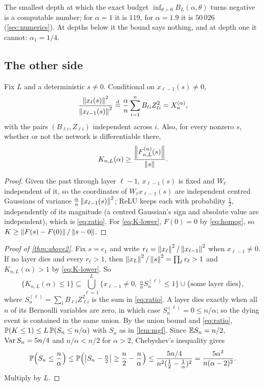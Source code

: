 The smallest depth at which the exact budget $\inf_{\theta>0}B_L(\alpha,\theta)$ turns negative is a computable number; for $\alpha=1$ it is $119$, for $\alpha=1.9$ it is $50\,026$ (\cref{sec:numerics}). At depths below it the bound says nothing, and at depth one it cannot: $\alpha_1=1/4$.

\subsection{The other side}

\begin{lemma}\label{lem:forward}
Fix $L$ and a deterministic $s\ne0$. Conditional on $x_{\ell-1}(s)\ne0$,
\begin{equation}\label{eq:ratio}
\frac{\left\lVert x_\ell(s)\right\rVert^2}{\left\lVert x_{\ell-1}(s)\right\rVert^2}\overset{\mathrm{d}}{=}\frac\alpha n\sum_{i=1}^nB_{\ell i}Z_{\ell i}^2=X_n^{(\alpha)},
\end{equation}
with the pairs $(B_{\ell i},Z_{\ell i})$ independent across $i$. Also, for every nonzero $s$, whether or not the network is differentiable there,
\begin{equation}\label{eq:K-lower}
K_{n,L}(\alpha)\ge\frac{\left\lVert F^{(\alpha)}_{n,L}(s)\right\rVert}{\left\lVert s\right\rVert}.
\end{equation}
\end{lemma}

\begin{proof}
Given the past through layer $\ell-1$, $x_{\ell-1}(s)$ is fixed and $W_\ell$ independent of it, so the coordinates of $W_\ell x_{\ell-1}(s)$ are independent centred Gaussians of variance $\frac\alpha n\left\lVert x_{\ell-1}(s)\right\rVert^2$; ReLU keeps each with probability $\tfrac12$, independently of its magnitude (a centred Gaussian's sign and absolute value are independent), which is \cref{eq:ratio}. For \cref{eq:K-lower}, $F(0)=0$ by \cref{eq:homog}, so $K\ge\left\lVert F(s)-F(0)\right\rVert/\left\lVert s-0\right\rVert$.
\end{proof}

\begin{proof}[Proof of \cref{thm:above2}]
Fix $s=e_1$ and write $r_\ell=\left\lVert x_\ell\right\rVert^2/\left\lVert x_{\ell-1}\right\rVert^2$ when $x_{\ell-1}\ne0$. If no layer dies and every $r_\ell>1$, then $\left\lVert x_L\right\rVert^2/\left\lVert s\right\rVert^2=\prod_\ell r_\ell>1$ and $K_{n,L}(\alpha)>1$ by \cref{eq:K-lower}. So
\[
\{K_{n,L}(\alpha)\le1\}\subseteq\bigcup_{\ell=1}^L\{x_{\ell-1}\ne0,\ \tfrac\alpha nS^{(\ell)}_n\le1\}\cup\{\text{some layer dies}\},
\]
where $S^{(\ell)}_n=\sum_iB_{\ell i}Z_{\ell i}^2$ is the sum in \cref{eq:ratio}. A layer dies exactly when all $n$ of its Bernoulli variables are zero, in which case $S^{(\ell)}_n=0\le n/\alpha$; so the dying event is contained in the same union. By the union bound and \cref{eq:ratio}, $\mathbb{P}(K\le1)\le L\,\mathbb{P}(S_n\le n/\alpha)$ with $S_n$ as in \cref{lem:mgf}. Since $\mathbb{E} S_n=n/2$, $\operatorname{Var} S_n=5n/4$ and $n/\alpha<n/2$ for $\alpha>2$, Chebyshev's inequality gives
\[
\mathbb{P}\Bigl(S_n\le\frac n\alpha\Bigr)\le\mathbb{P}\Bigl(\left\lvert S_n-\tfrac n2\right\rvert\ge\frac n2-\frac n\alpha\Bigr)\le\frac{5n/4}{n^2(\frac12-\frac1\alpha)^2}=\frac{5\alpha^2}{n(\alpha-2)^2}.
\]
Multiply by $L$.
\end{proof}

